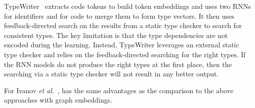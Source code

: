 TypeWriter~\cite{typewriter-fse20} extracts code tokens to build token
embeddings and uses two RNNs for identifiers and for code to merge
them to form type vectors. It then uses feedback-directed search on
the results from a static type checker to search for consistent types.
The key limitation is that the type dependencies are not encoded
during the learning. Instead, TypeWriter leverages an external static
type checker and relies on the feedback-directed searching for the
right types. If the RNN models do not produce the right types at the
first place, then the searching via a static type checker will not
result in any better output.

For Ivanov {\em et al.}~\cite{ivanov21predicting}, {\tool} has
the same advantages as the comparison to the above approaches
with graph embeddings.





